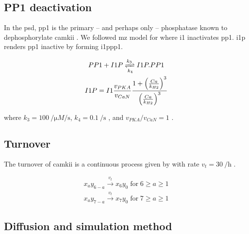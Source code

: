 \documentclass[9pt,lineno]{elife}
\begin{document}
{\subsection{PP1 deactivation}\label{subsec:pp1_deactivation} 

In the \gls{psd}, \gls{pp1} is the primary -- and perhaps only -- phosphatase
known to dephosphorylate \gls{camkii} \citep{strack_translocation_1997}.  We
followed \gls{mz} model for  where \gls{i1} inactivates \gls{pp1}. 
\Gls{i1p} renders \gls{pp1} inactive by forming \gls{i1ppp1}. 

\begin{equation}\label{eq:i1pandpp1}
    \begin{gathered}
        PP1 + I1P \xrightleftharpoons[k_4]{k_3} I1P.PP1 \\
        I1P = I1 \frac{v_{PKA}}{v_{CaN}} 
            \frac{1+\left(\frac{Ca}{k_{H2}}\right)^3}{\left(\frac{Ca}{k_{H2}}\right)^3}
    \end{gathered}
\end{equation}

\noindent where $k_3=\SI{100}{\per\micro M\per\second}$,
$k_4=\SI{0.1}{\per\second}$ \citep{endo_multiple_1996}, and $v_{PKA}/v_{CaN}=1$
\citep{miller_stability_2005}.

\subsection{Turnover}\label{turnover}

The turnover of \gls{camkii} is a continuous process given by  with rate
$v_{t}=\SI{30}{\per\hour}$ \citep{ehlers_activity_2003}.

\begin{equation} \label{eq:turnover}
    \begin{gathered}
        x_ay_{6-a} \xrightarrow{v_t} x_6y_0\; \text{for}\; 6\ge a\ge 1 \\
        x_ay_{7-a} \xrightarrow{v_t} x_7y_0\; \text{for}\; 7\ge a\ge 1
    \end{gathered}
\end{equation}

\subsection{Diffusion and simulation method}\label{subsec:simulator}

}
\end{document}
